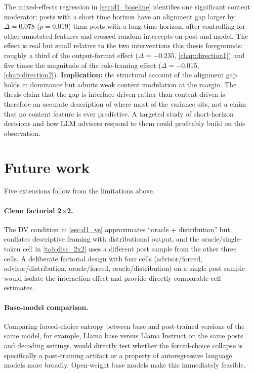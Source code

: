 The mixed-effects regression in \cref{sec:d1_baseline} identifies one
significant content moderator: posts with a short time horizon have
an alignment gap larger by $\Delta = 0.078$ ($p = 0.019$) than posts
with a long time horizon, after controlling for other annotated
features and crossed random intercepts on post and model. The effect
is real but small relative to the two interventions this thesis
foregrounds: roughly a third of the output-format effect
($\Delta = -0.235$, \cref{chap:direction1}) and five times the
magnitude of the role-framing effect ($\Delta = -0.015$,
\cref{chap:direction2}).
\textbf{Implication:} the structural account of the alignment gap
holds in dominance but admits weak content modulation at the margin.
The thesis claim that the gap is interface-driven rather than
content-driven is therefore an accurate description of where most of
the variance sits, not a claim that no content feature is ever
predictive. A targeted study of short-horizon decisions and how LLM
advisers respond to them could profitably build on this observation.

\section{Future work}
\label{sec:disc_future_work}

Five extensions follow from the limitations above.

\paragraph{Clean factorial 2$\times$2.} The DV condition in
\cref{sec:d1_vs} approximates ``oracle + distribution'' but conflates
descriptive framing with distributional output, and the
oracle/single-token cell in \cref{tab:disc_2x2} uses a different
post sample from the other three cells. A deliberate factorial design
with four cells (advisor/forced, advisor/distribution, oracle/forced,
oracle/distribution) on a single post sample would isolate the
interaction effect and provide directly comparable cell estimates.

\paragraph{Base-model comparison.}
\label{sec:disc_fw_base}
Comparing forced-choice entropy between base and post-trained versions
of the same model, for example, Llama base versus Llama Instruct on
the same posts and decoding settings, would directly test whether
the forced-choice collapse is specifically a post-training artifact or
a property of autoregressive language models more broadly. Open-weight
base models make this immediately feasible.

